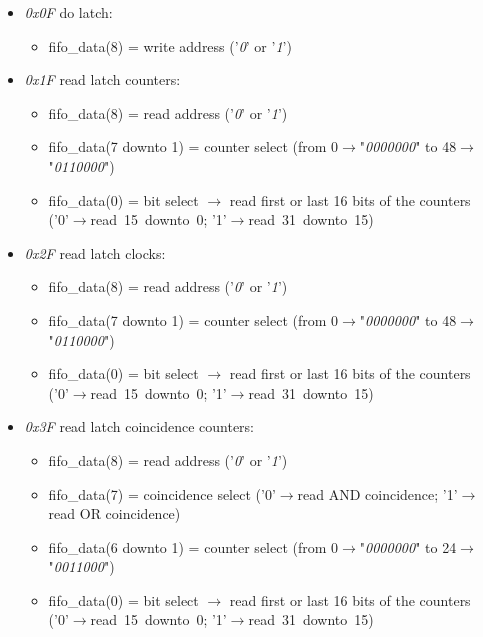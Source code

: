 \begin{itemize}
	\item \textit{0x0F} do latch: 
	\begin{itemize}
		\item fifo\_data(8) = write address ('\textit{0}' or '\textit{1}')
	\end{itemize}
	\item \textit{0x1F} read latch counters:
	\begin{itemize}
		\item fifo\_data(8) = read address ('\textit{0}' or '\textit{1}')
		\item fifo\_data(7 downto 1) = counter select (from 0$\rightarrow$"\textit{0000000}" to 48$\rightarrow$"\textit{0110000}")
		\item fifo\_data(0) = bit select $\rightarrow$ read first or last 16 bits of the counters \\('0'$\rightarrow$read~15~downto~0; '1'$\rightarrow$read~31~downto~15)
	\end{itemize}
	\item \textit{0x2F} read latch clocks:
	\begin{itemize}
		\item fifo\_data(8) = read address ('\textit{0}' or '\textit{1}')
		\item fifo\_data(7 downto 1) = counter select (from 0$\rightarrow$"\textit{0000000}" to 48$\rightarrow$"\textit{0110000}")
		\item fifo\_data(0) = bit select $\rightarrow$ read first or last 16 bits of the counters \\('0'$\rightarrow$read~15~downto~0; '1'$\rightarrow$read~31~downto~15)
	\end{itemize}
	\item \textit{0x3F} read latch coincidence counters:
	\begin{itemize}
		\item fifo\_data(8) = read address ('\textit{0}' or '\textit{1}')
		\item fifo\_data(7) = coincidence select ('0'$\rightarrow$read AND coincidence; '1'$\rightarrow$read OR coincidence)
		\item fifo\_data(6 downto 1) = counter select (from 0$\rightarrow$"\textit{0000000}" to 24$\rightarrow$"\textit{0011000}")
		\item fifo\_data(0) = bit select $\rightarrow$ read first or last 16 bits of the counters \\('0'$\rightarrow$read~15~downto~0; '1'$\rightarrow$read~31~downto~15)
	\end{itemize}

\end{itemize}
